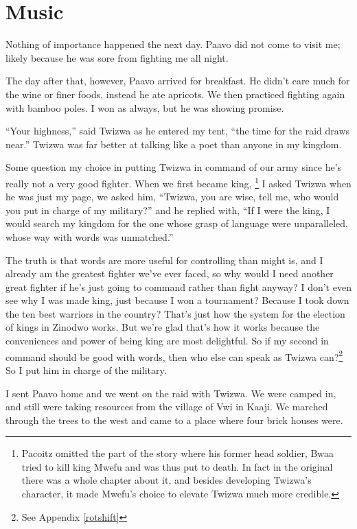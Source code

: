 \chapter{Music}

Nothing of importance happened the next day. Paavo did not come to visit me; likely because he was sore from fighting me all night.

The day after that, however, Paavo arrived for breakfast. He didn't care much for the wine or finer foods, instead he ate apricots. We then practiced fighting again with bamboo poles. I won as always, but he was showing promise.

``Your highness,'' said Twizwa as he entered my tent, ``the time for the raid draws near.'' Twizwa was far better at talking like a poet than anyone in my kingdom.

Some question my choice in putting Twizwa in command of our army since he's really not a very good fighter. When we first became king,
\footnote{Pacoitz omitted the part of the story where his former head soldier, Bwaa tried to kill king Mwefu and was thus put to death. In fact in the original there was a whole chapter about it, and besides developing Twizwa's character, it made Mwefu's choice to elevate Twizwa much more credible.}
I asked Twizwa when he was just my page, we asked him, ``Twizwa, you are wise, tell me, who would you put in charge of my military?'' and he replied with, ``If I were the king, I would search my kingdom for the one whose grasp of language were unparalleled, whose way with words was unmatched.''

The truth is that words are more useful for controlling than might is, and I already am the greatest fighter we've ever faced, so why would I need another great fighter if he's just going to command rather than fight anyway? I don't even see why I was made king, just because I won a tournament? Because I took down the ten best warriors in the country? That's just how the system for the election of kings in Zinodwo works. But we're glad that's how it works because the conveniences and power of being king are most delightful.
So if my second in command should be good with words, then who else can speak as Twizwa can?\footnote{See Appendix \ref{rotshift}} So I put him in charge of the military.

I sent Paavo home and we went on the raid with Twizwa. We were camped in, and still were taking resources from the village of Vwi in Kaaji. We marched through the trees to the west and came to a place where four brick houses were.

